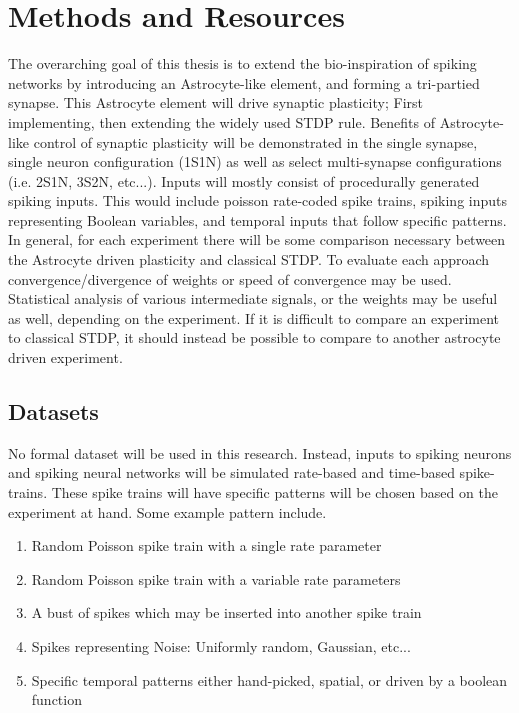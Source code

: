 %
%


\chapter{Methods and Resources} \label{section:methods}
    The overarching goal of this thesis is to extend the bio-inspiration of
    spiking networks by introducing an Astrocyte-like element, and forming a
    tri-partied synapse. This Astrocyte element will drive synaptic plasticity;
    First implementing, then extending the widely used STDP rule. Benefits of
    Astrocyte-like control of synaptic plasticity will be demonstrated in the
    single synapse, single neuron configuration (1S1N) as well as select
    multi-synapse configurations (i.e. 2S1N, 3S2N, etc...). Inputs will mostly
    consist of procedurally generated spiking inputs. This would include poisson
    rate-coded spike trains, spiking inputs representing Boolean variables, and
    temporal inputs that follow specific patterns. In general, for each
    experiment there will be some comparison necessary between the Astrocyte
    driven plasticity and classical STDP. To evaluate each approach
    convergence/divergence of weights or speed of convergence may be
    used. Statistical analysis of various intermediate signals, or the weights
    may be useful as well, depending on the experiment. If it is difficult to
    compare an experiment to classical STDP, it should instead be possible to
    compare to another astrocyte driven experiment.

    \section{Datasets} \label{section:datasets}
    No formal dataset will be used in this research. Instead, inputs to spiking
    neurons and spiking neural networks will be simulated rate-based and
    time-based spike-trains. These spike trains will have specific patterns will
    be chosen based on the experiment at hand. Some example pattern include.
    \begin{enumerate}
    \item Random Poisson spike train with a single rate parameter
    \item Random Poisson spike train with a variable rate parameters
    \item A bust of spikes which may be inserted into another spike train
    \item Spikes representing Noise: Uniformly random, Gaussian, etc...
    \item Specific temporal patterns either hand-picked, spatial, or driven by a
      boolean function
    \end{enumerate}
        
